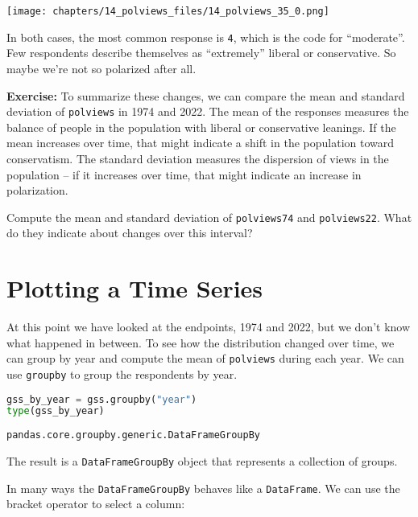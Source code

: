 \begin{center}
\texttt{[image: chapters/14\_polviews\_files/14\_polviews\_35\_0.png]}
\end{center}

In both cases, the most common response is \passthrough{\lstinline!4!},
which is the code for ``moderate''. Few respondents describe themselves
as ``extremely'' liberal or conservative. So maybe we're not so
polarized after all.

\textbf{Exercise:} To summarize these changes, we can compare the mean
and standard deviation of \passthrough{\lstinline!polviews!} in 1974 and
2022. The mean of the responses measures the balance of people in the
population with liberal or conservative leanings. If the mean increases
over time, that might indicate a shift in the population toward
conservatism. The standard deviation measures the dispersion of views in
the population -- if it increases over time, that might indicate an
increase in polarization.

Compute the mean and standard deviation of
\passthrough{\lstinline!polviews74!} and
\passthrough{\lstinline!polviews22!}. What do they indicate about
changes over this interval?

\hypertarget{plotting-a-time-series}{%
\section{Plotting a Time Series}\label{plotting-a-time-series}}

At this point we have looked at the endpoints, 1974 and 2022, but we
don't know what happened in between. To see how the distribution changed
over time, we can group by year and compute the mean of
\passthrough{\lstinline!polviews!} during each year. We can use
\passthrough{\lstinline!groupby!} to group the respondents by year.

\begin{lstlisting}[language=Python,style=source]
gss_by_year = gss.groupby("year")
type(gss_by_year)
\end{lstlisting}

\begin{lstlisting}[style=output]
pandas.core.groupby.generic.DataFrameGroupBy
\end{lstlisting}

The result is a \passthrough{\lstinline!DataFrameGroupBy!} object that
represents a collection of groups.

In many ways the \passthrough{\lstinline!DataFrameGroupBy!} behaves like
a \passthrough{\lstinline!DataFrame!}. We can use the bracket operator
to select a column:

